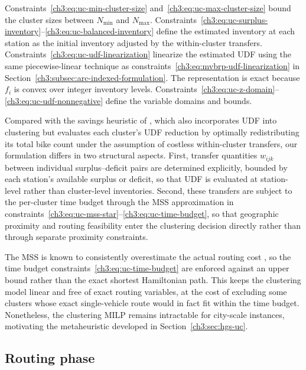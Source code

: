 Constraints~\eqref{ch3:eq:uc-min-cluster-size} and~\eqref{ch3:eq:uc-max-cluster-size} bound the cluster sizes between $N_{\min}$ and $N_{\max}$. Constraints~\eqref{ch3:eq:uc-surplus-inventory}--\eqref{ch3:eq:uc-balanced-inventory} define the estimated inventory at each station as the initial inventory adjusted by the within-cluster transfers. Constraints~\eqref{ch3:eq:uc-udf-linearization} linearize the estimated UDF using the same piecewise-linear technique as constraints~\eqref{ch3:eq:mvbrp-udf-linearization} in Section~\ref{ch3:subsec:arc-indexed-formulation}. The representation is exact because $f_i$ is convex over integer inventory levels. Constraints~\eqref{ch3:eq:uc-z-domain}--\eqref{ch3:eq:uc-udf-nonnegative} define the variable domains and bounds.

Compared with the savings heuristic of \citet{forma3stepMathHeuristic2015}, which also incorporates UDF into clustering but evaluates each cluster's UDF reduction by optimally redistributing its total bike count under the assumption of costless within-cluster transfers, our formulation differs in two structural aspects. First, transfer quantities $w_{ijk}$ between individual surplus--deficit pairs are determined explicitly, bounded by each station's available surplus or deficit, so that UDF is evaluated at station-level rather than cluster-level inventories. Second, these transfers are subject to the per-cluster time budget through the MSS approximation in constraints~\eqref{ch3:eq:uc-mss-star}--\eqref{ch3:eq:uc-time-budget}, so that geographic proximity and routing feasibility enter the clustering decision directly rather than through separate proximity constraints.

The MSS is known to consistently overestimate the actual routing cost \citep{schuijbroekInventoryRebalancingVehicle2017}, so the time budget constraints~\eqref{ch3:eq:uc-time-budget} are enforced against an upper bound rather than the exact shortest Hamiltonian path. This keeps the clustering model linear and free of exact routing variables, at the cost of excluding some clusters whose exact single-vehicle route would in fact fit within the time budget. Nonetheless, the clustering MILP remains intractable for city-scale instances, motivating the metaheuristic developed in Section~\ref{ch3:sec:hgs-uc}.

\subsection{Routing phase}\label{ch3:subsec:routing-phase}

